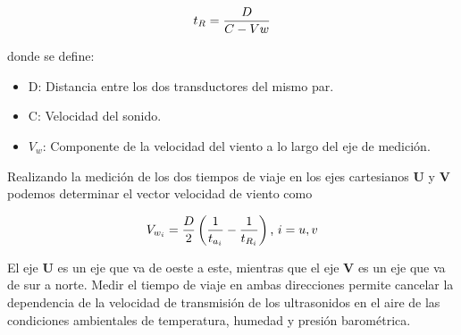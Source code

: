 \begin{equation}
  \centering
  t_{R} = \frac{D}{C - Vw}
  \label{eq:t_R}
\end{equation}

donde se define:
\begin{itemize}
  \item D: Distancia entre los dos transductores del mismo par.
  \item C: Velocidad del sonido.
  \item $V_{w}$: Componente de la velocidad del viento a lo largo del eje de medición.
\end{itemize}

Realizando la medición de los dos tiempos de viaje en los ejes cartesianos $\mathbf{U}$ y $\mathbf{V}$ podemos determinar el vector velocidad de viento como 


\begin{equation}
  \centering
  V_{w_{i}} = \frac{D}{2}\left(\frac{1}{t_{a_{i}}}-\frac{1}{t_{R_{i}}}\right)\text{,  } i= u,v
  \label{eq:velViento}
\end{equation}

El eje $\mathbf{U}$ es un eje que va de oeste a este, mientras que el eje $\mathbf{V}$ es un eje que va de sur a norte. Medir el tiempo de viaje en ambas direcciones permite cancelar la dependencia de la velocidad de transmisión de los ultrasonidos en el aire de las condiciones ambientales de temperatura, humedad y presión barométrica.



